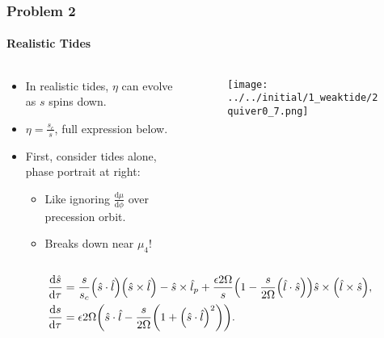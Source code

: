 \documentclass[dvipsnames, 11pt]{beamer}
\newcommand*{\rd}[2]{\frac{\mathrm{d}#1}{\mathrm{d}#2}}
\DeclarePairedDelimiter\p{\lparen}{\rparen}
\begin{document}
\begin{frame}
    \frametitle{Problem 2}
    \framesubtitle{Realistic Tides}

    \begin{columns}
        \begin{column}{0.5\textwidth}
            \begin{itemize}
                \item In realistic tides, $\eta$ can evolve as $s$ spins down.

                \item $\eta = \frac{s_c}{s}$, full expression below.

                \item First, consider tides alone, phase portrait at right:

                \begin{itemize}
                    \item Like ignoring $\rd{\mu}{\phi}$ over precession orbit.

                    \item Breaks down near $\mu_4$!
                \end{itemize}
            \end{itemize}
        \end{column}
        \begin{column}{0.5\textwidth}
            \begin{figure}[t]
                \centering
                \texttt{[image: ../../initial/1\_weaktide/2quiver0\_7.png]}
            \end{figure}
        \end{column}
    \end{columns}

    \begin{align}
        \rd{\hat{s}}{\tau}
            &= \frac{s}{s_c}\p*{\hat{s} \cdot \hat{l}}
                \p*{\hat{s} \times \hat{l}}
                - \hat{s} \times \hat{l}_p
                + \frac{\epsilon 2\Omega}{s}
                    \p*{1 - \frac{s}{2\Omega}\p*{\hat{l} \cdot \hat{s}}}
                        \hat{s} \times \p*{\hat{l} \times \hat{s}},\\
        \rd{s}{\tau}
            &= \epsilon 2\Omega \p*{\hat{s} \cdot \hat{l} - \frac{s}{2\Omega}\p*{1
                + \p*{\hat{s} \cdot \hat{l}}^2}}.
    \end{align}
\end{frame}
\end{document}
